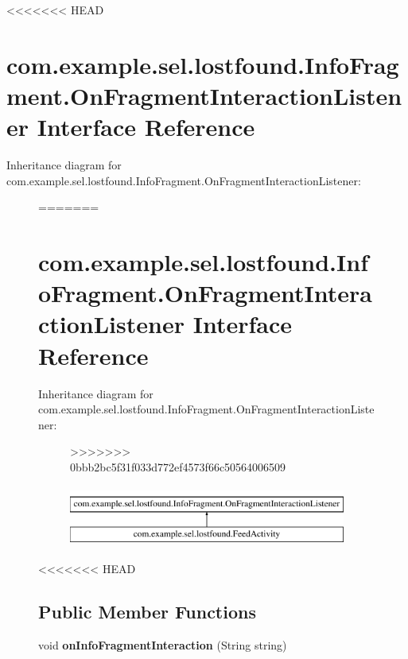 <<<<<<< HEAD
\hypertarget{interfacecom_1_1example_1_1sel_1_1lostfound_1_1InfoFragment_1_1OnFragmentInteractionListener}{\section{com.\-example.\-sel.\-lostfound.\-Info\-Fragment.\-On\-Fragment\-Interaction\-Listener Interface Reference}
\label{interfacecom_1_1example_1_1sel_1_1lostfound_1_1InfoFragment_1_1OnFragmentInteractionListener}
}
Inheritance diagram for com.\-example.\-sel.\-lostfound.\-Info\-Fragment.\-On\-Fragment\-Interaction\-Listener\-:\begin{figure}[H]
=======
\hypertarget{interfacecom_1_1example_1_1sel_1_1lostfound_1_1InfoFragment_1_1OnFragmentInteractionListener}{\section{com.\-example.\-sel.\-lostfound.\-Info\-Fragment.\-On\-Fragment\-Interaction\-Listener \-Interface \-Reference}
\label{interfacecom_1_1example_1_1sel_1_1lostfound_1_1InfoFragment_1_1OnFragmentInteractionListener}
}
\-Inheritance diagram for com.\-example.\-sel.\-lostfound.\-Info\-Fragment.\-On\-Fragment\-Interaction\-Listener\-:\begin{figure}[H]
>>>>>>> 0bbb2bc5f31f033d772ef4573f66c50564006509
\begin{center}
\leavevmode
\includegraphics[height=2.000000cm]{interfacecom_1_1example_1_1sel_1_1lostfound_1_1InfoFragment_1_1OnFragmentInteractionListener}
\end{center}
\end{figure}
<<<<<<< HEAD
\subsection*{Public Member Functions}
\begin{DoxyCompactItemize}
\item 
\hypertarget{interfacecom_1_1example_1_1sel_1_1lostfound_1_1InfoFragment_1_1OnFragmentInteractionListener_a6aa219ac44d543de0564fc4d60ddb055}{void {\bfseries on\-Info\-Fragment\-Interaction} (String string)}\label{interfacecom_1_1example_1_1sel_1_1lostfound_1_1InfoFragment_1_1OnFragmentInteractionListener_a6aa219ac44d543de0564fc4d60ddb055}


\end{DoxyCompactItemize}
\end{figure}
